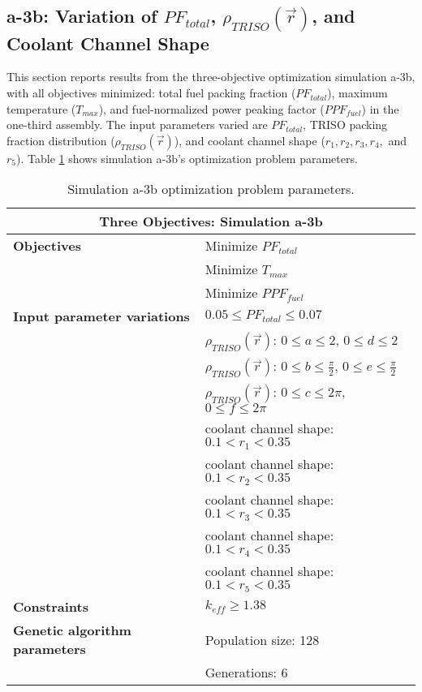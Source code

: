 \subsection{a-3b: Variation of $PF_{total}$, $\rho_{TRISO}(\vec{r})$, and Coolant 
Channel Shape}
\label{sec:a-3b}
This section reports results from the three-objective optimization simulation a-3b, 
with all objectives minimized: total fuel packing fraction ($PF_{total}$), maximum 
temperature ($T_{max}$), and fuel-normalized power peaking factor ($PPF_{fuel}$)
in the one-third assembly.  
The input parameters varied are $PF_{total}$, TRISO packing fraction distribution 
($\rho_{TRISO}(\vec{r})$), and coolant channel shape ($r_1, r_2, r_3, r_4,$ and $r_5$).  
Table \ref{tab:simulationa3b} shows simulation a-3b's optimization problem parameters. 
\begin{table}[htbp!]
    \centering
    \onehalfspacing
    \caption{Simulation a-3b optimization problem parameters.}
	\label{tab:simulationa3b}
    \footnotesize
    \begin{tabular}{l|p{6.5cm}}
    \hline 
    \multicolumn{2}{c}{\textbf{Three Objectives: Simulation a-3b}} \\
    \hline 
    \textbf{Objectives} & Minimize $PF_{total}$ \\
    & Minimize $T_{max}$ \\
    & Minimize $PPF_{fuel}$ \\
    \hline 
    \textbf{Input parameter variations} & $0.05 \leq PF_{total} \leq 0.07$ \\
    & $\rho_{TRISO}(\vec{r})$: $0 \leq a \leq 2$, $0 \leq d \leq 2$\\
    & $\rho_{TRISO}(\vec{r})$: $0 \leq b \leq \frac{\pi}{2}$, $0 \leq e \leq \frac{\pi}{2}$\\
    & $\rho_{TRISO}(\vec{r})$: $0 \leq c \leq 2\pi$, $0 \leq f \leq 2\pi$\\
    & coolant channel shape: $0.1<r_{1}<0.35$ \\
    & coolant channel shape: $0.1<r_{2}<0.35$ \\
    & coolant channel shape: $0.1<r_{3}<0.35$ \\
    & coolant channel shape: $0.1<r_{4}<0.35$ \\
    & coolant channel shape: $0.1<r_{5}<0.35$ \\
    \hline
    \textbf{Constraints} & $k_{eff} \geq 1.38$\\ 
    \hline 
    \textbf{Genetic algorithm parameters} & Population size: 128 \\
    & Generations: 6 \\
    \hline
    \end{tabular}
\end{table}

